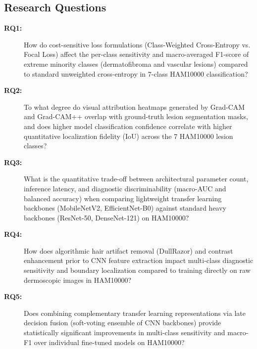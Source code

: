 \documentclass[11pt,a4paper]{article}
\begin{document}
\subsection*{Research Questions}
\begin{description}
\item[\textbf{RQ1:}] How do cost-sensitive loss formulations (Class-Weighted Cross-Entropy vs. Focal Loss) affect the per-class sensitivity and macro-averaged F1-score of extreme minority classes (dermatofibroma and vascular lesions) compared to standard unweighted cross-entropy in 7-class HAM10000 classification?
\item[\textbf{RQ2:}] To what degree do visual attribution heatmaps generated by Grad-CAM and Grad-CAM++ overlap with ground-truth lesion segmentation masks, and does higher model classification confidence correlate with higher quantitative localization fidelity (IoU) across the 7 HAM10000 lesion classes?
\item[\textbf{RQ3:}] What is the quantitative trade-off between architectural parameter count, inference latency, and diagnostic discriminability (macro-AUC and balanced accuracy) when comparing lightweight transfer learning backbones (MobileNetV2, EfficientNet-B0) against standard heavy backbones (ResNet-50, DenseNet-121) on HAM10000?
\item[\textbf{RQ4:}] How does algorithmic hair artifact removal (DullRazor) and contrast enhancement prior to CNN feature extraction impact multi-class diagnostic sensitivity and boundary localization compared to training directly on raw dermoscopic images in HAM10000?
\item[\textbf{RQ5:}] Does combining complementary transfer learning representations via late decision fusion (soft-voting ensemble of CNN backbones) provide statistically significant improvements in multi-class sensitivity and macro-F1 over individual fine-tuned models on HAM10000?

\end{description}
\end{document}
